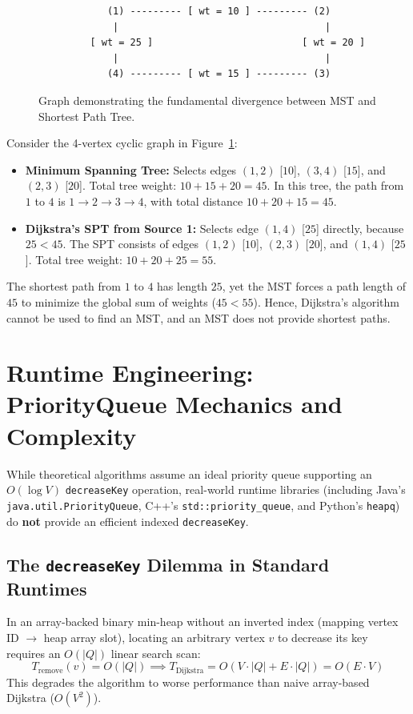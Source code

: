 \documentclass[10pt,journal,compsoc,onecolumn]{IEEEtran}
\begin{document}
\begin{figure}[h]
\centering
\begin{verbatim}
            (1) --------- [ wt = 10 ] --------- (2)
             |                                    |
         [ wt = 25 ]                          [ wt = 20 ]
             |                                    |
            (4) --------- [ wt = 15 ] --------- (3)
\end{verbatim}
\caption{Graph demonstrating the fundamental divergence between MST and Shortest Path Tree.}
\label{fig:mst_vs_dijkstra}
\end{figure}

Consider the 4-vertex cyclic graph in Figure~\ref{fig:mst_vs_dijkstra}:
\begin{itemize}
    \item \textbf{Minimum Spanning Tree:} Selects edges $(1, 2)$ [$10$], $(3, 4)$ [$15$], and $(2, 3)$ [$20$]. Total tree weight: $10 + 15 + 20 = 45$. In this tree, the path from $1$ to $4$ is $1 \to 2 \to 3 \to 4$, with total distance $10 + 20 + 15 = 45$.
    \item \textbf{Dijkstra's SPT from Source 1:} Selects edge $(1, 4)$ [$25$] directly, because $25 < 45$. The SPT consists of edges $(1, 2)$ [$10$], $(2, 3)$ [$20$], and $(1, 4)$ [$25$]. Total tree weight: $10 + 20 + 25 = 55$.
\end{itemize}
The shortest path from $1$ to $4$ has length $25$, yet the MST forces a path length of $45$ to minimize the global sum of weights ($45 < 55$). Hence, Dijkstra's algorithm cannot be used to find an MST, and an MST does not provide shortest paths.

\section{Runtime Engineering: PriorityQueue Mechanics and Complexity}
\label{sec:runtime_engineering}

While theoretical algorithms assume an ideal priority queue supporting an $O(\log V)$ \texttt{decreaseKey} operation, real-world runtime libraries (including Java's \texttt{java.util.PriorityQueue}, C++'s \texttt{std::priority\_queue}, and Python's \texttt{heapq}) do \textbf{not} provide an efficient indexed \texttt{decreaseKey}.

\subsection{The \texttt{decreaseKey} Dilemma in Standard Runtimes}
In an array-backed binary min-heap without an inverted index (mapping vertex ID $\to$ heap array slot), locating an arbitrary vertex $v$ to decrease its key requires an $O(|Q|)$ linear search scan:
\begin{equation}
T_{\text{remove}}(v) = O(|Q|) \implies T_{\text{Dijkstra}} = O(V \cdot |Q| + E \cdot |Q|) = O(E \cdot V)
\end{equation}
This degrades the algorithm to worse performance than naive array-based Dijkstra ($O(V^2)$).
\end{document}
